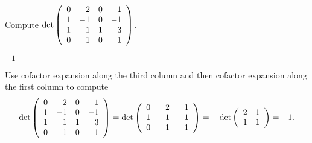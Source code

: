 \documentclass{ximera}
\author{Matthew Carr}
\begin{document}
\begin{exercise}\label{mc7_1A}

Compute \quad $\det\left(\begin{array}{rrrrrrrrrrrrrrrrrr} 0 & 2 & 0 & 1\\ 1 & -1 & 0 & -1\\ 1 & 1 & 1& 3\\ 0 & 1 & 0 & 1 \end{array}\right)$.
  
\begin{solution}

\ans $-1$

\soln Use cofactor expansion along the third column and then cofactor expansion along the first column to compute
\[
\det\left(\begin{array}{rrrrrrrrrrrrrrrrrr} 0 & 2 & 0 & 1\\ 1 & -1 & 0 & -1\\ 1 & 1 & 1& 3\\ 0 & 1 & 0 & 1 \end{array}\right) = 
\det\left(\begin{array}{rrrrrrrrrrrrrrrrrr} 0 & 2 & 1\\ 1 & -1 &  -1\\  0& 1 & 1 \end{array}\right) = -\det\left(\begin{array}{rrrrrrrrrrrrrrrrrr} 2 & 1\\ 1 & 1 \end{array}\right) = -1\ldotp
\]
\end{solution}
\end{exercise}
\end{document}
